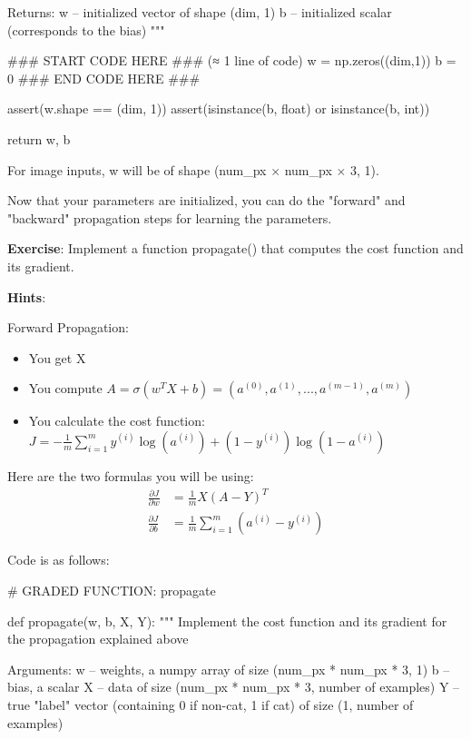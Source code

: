 {{\begin{mypython}
    Returns:
    w -- initialized vector of shape (dim, 1)
    b -- initialized scalar (corresponds to the bias)
    """
    
    ### START CODE HERE ### (≈ 1 line of code)
    w = np.zeros((dim,1))
    b = 0
    ### END CODE HERE ###

    assert(w.shape == (dim, 1))
    assert(isinstance(b, float) or isinstance(b, int))
    
    return w, b
\end{mypython}

For image inputs, w will be of shape (num\_px  $\times$  num\_px  $\times$  3, 1).



Now that your parameters are initialized, you can do the "forward" and "backward" propagation steps for learning the parameters.

{\textbf {Exercise}}: Implement a function propagate() that computes the cost function and its gradient.

{\textbf {Hints}}:

Forward Propagation:
\begin{itemize}
\item You get X
\item You compute $A = \sigma(w^T X + b) = (a^{(0)}, a^{(1)}, ..., a^{(m-1)}, a^{(m)})$
\item You calculate the cost function: $J = -\frac{1}{m}\sum_{i=1}^{m}y^{(i)}\log(a^{(i)})+(1-y^{(i)})\log(1-a^{(i)})$
\end{itemize}

Here are the two formulas you will be using: 
\begin{align}
\frac{\partial J}{\partial w} &= \frac{1}{m}X(A-Y)^T\\
\frac{\partial J}{\partial b} &= \frac{1}{m} \sum_{i=1}^m (a^{(i)}-y^{(i)})
\end{align}

Code is as follows:
\clearpage
\begin{mypython}
# GRADED FUNCTION: propagate

def propagate(w, b, X, Y):
    """
    Implement the cost function and its gradient for the propagation explained above

    Arguments:
    w -- weights, a numpy array of size (num_px * num_px * 3, 1)
    b -- bias, a scalar
    X -- data of size (num_px * num_px * 3, number of examples)
    Y -- true "label" vector (containing 0 if non-cat, 1 if cat) of size (1, number of examples)


\end{mypython}}}
